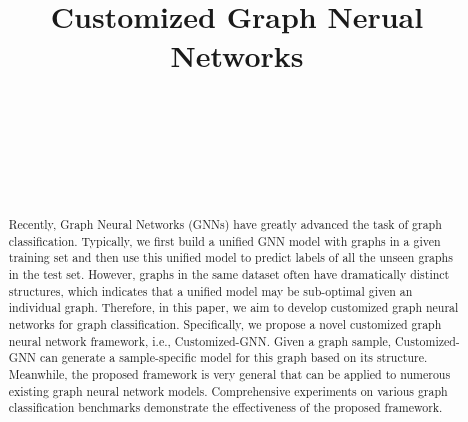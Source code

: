 \documentclass[11pt,dvipdfm]{article}
\begin{document}
\title{Customized Graph Nerual Networks}
 

\author{
    \\
    \\
    \\
    \\
    \\
    }


 
\maketitle
\renewcommand\thesection{\arabic{section}}
\setcounter{section}{0}
\setcounter{figure}{0}
\setcounter{table}{0}

\begin{abstract}
Recently, Graph Neural Networks (GNNs) have greatly advanced the task of graph classification. Typically, we first build a unified GNN model with graphs in a given training set and then use this unified model to predict labels of all the unseen graphs in the test set. However, graphs in the same dataset often have dramatically distinct structures, which indicates that a unified model may be sub-optimal given an individual graph. Therefore, in this paper, we aim to develop customized graph neural networks for graph classification. 
Specifically, we propose a novel customized graph neural network framework, i.e., Customized-GNN. Given a graph sample, Customized-GNN can generate a sample-specific model for this graph based on its structure. Meanwhile, the proposed framework is very general that can be applied to numerous existing graph neural network models. Comprehensive experiments on various graph classification benchmarks demonstrate the effectiveness of the proposed framework.
\end{abstract}
\end{document}
